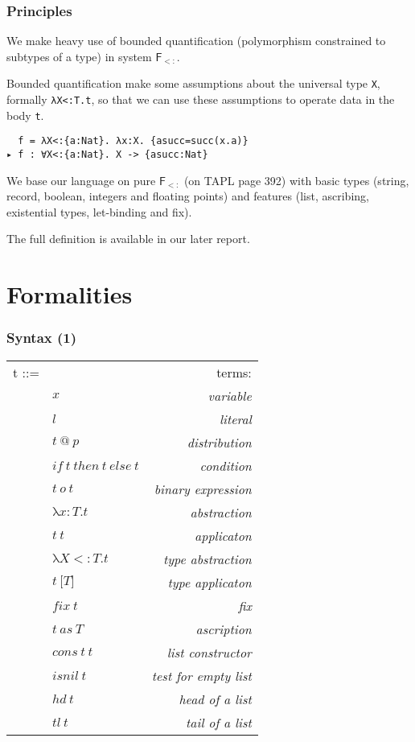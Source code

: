\documentclass{beamer}
\makeatletter
\newcommand{\ty}{{:}}
\newcommand{\su}{{<:}}
\newcommand{\at}{\texttt{@}}
\newcommand{\tlb}{\texttt{[}}
\newcommand{\trb}{\texttt{]}}
\makeatother
\begin{document}
\begin{frame}[fragile]
\frametitle{Principles}

We make heavy use of bounded quantification (polymorphism constrained to subtypes of a type) in system $\mathsf{F_{<:}}$.

Bounded quantification make some assumptions about the universal type \verb|X|, formally \verb|λX<:T.t|, so that we can use these assumptions to operate data in the body \verb|t|.

\begin{example}
    \verb|  f = λX<:{a:Nat}. λx:X. {asucc=succ(x.a)}|
    \\
    \verb|▸ f : ∀X<:{a:Nat}. X -> {asucc:Nat}|
\end{example}

We base our language on pure $\mathsf{F_{<:}}$ (on TAPL page 392) with basic types (string, record, boolean, integers and floating points) and features (list, ascribing, existential types, let-binding and fix).

The full definition is available in our later report.

\end{frame}

\section{Formalities}

\begin{frame}[fragile]
  \frametitle{Syntax (1)}
  \centering
  \begin{tabular}{llr}
      t ::= &  & terms: \\
      & $x$ & \textit{variable} \\
      & $l$ & \textit{literal} \\
      & $t~\at~p$ & \textit{distribution} \\
      & $if~t~then~t~else~t$ & \textit{condition} \\
      & $t~o~t$ & \textit{binary expression} \\
      & $\texttt{λ}x\ty T.t$ & \textit{abstraction} \\
      & $t~t$ & \textit{applicaton} \\
      & $\texttt{λ}X\su T.t$ & \textit{type abstraction} \\
      & $t~\tlb T\trb$ & \textit{type applicaton} \\
      & $fix~t$ & \textit{fix} \\
      & $t~as~T$ & \textit{ascription} \\
      & $cons~t~t$ & \textit{list constructor} \\
      & $isnil~t$ & \textit{test for empty list} \\
      & $hd~t$ & \textit{head of a list} \\
      & $tl~t$ & \textit{tail of a list} \\
  \end{tabular}

\end{frame}
\end{document}
